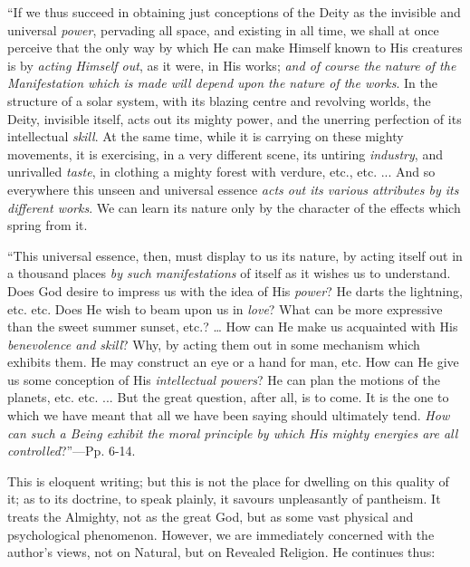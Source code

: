``If we thus
succeed in obtaining just conceptions of the Deity as the invisible
and universal \emph{power}, pervading all space, and existing in all
time, we shall at once perceive that the only way by which He can make
Himself known to His creatures is by \emph{acting Himself out}, as it
were, in His works; \emph{and of course the nature of the Manifestation
which is made will depend upon the nature of the works}. In the
structure of a solar system, with its blazing centre and revolving
worlds, the Deity, invisible itself, acts out its mighty power, and
the unerring perfection of its intellectual \emph{skill}. At the same
time, while it is carrying on these mighty movements, it is
exercising, in a very different scene, its untiring \emph{industry},
and unrivalled \emph{taste}, in clothing a mighty forest with verdure,
etc., etc. ... And so everywhere this unseen and universal essence \emph{acts
out its various attributes by its different works}. We can learn
its nature only by the character of the effects which spring from it.

``This universal
essence, then, must display to us its nature, by acting itself out in
a thousand places \emph{by such manifestations} of itself as it wishes
us to understand. Does God desire to impress us with the idea of His \emph{power}?
He darts the lightning, etc. etc. Does He wish to beam upon us in \emph{love}?
What can be more expressive than the sweet summer sunset, etc.? …
How can He make us acquainted with His \emph{benevolence and skill}?
Why, by acting them out in some mechanism which exhibits them. He may
construct an eye or a hand for man, etc. How can He give us some
conception of His \emph{intellectual powers}? He can plan the motions
of the planets, etc. etc. ... But the great question, after all, is to
come. It is the one to which we have meant that all we have been
saying should ultimately tend. \emph{How can such a Being exhibit the
moral principle by which His mighty energies are all controlled}?''—Pp.
6-14.

This is eloquent writing; but this is not the
place for dwelling on this quality of it; as to its doctrine, to
speak plainly, it savours unpleasantly of pantheism. It treats the
Almighty, not as the great God, but as some vast physical and
psychological phenomenon. However, we are immediately concerned with
the author's views, not on Natural, but on Revealed Religion. He
continues thus:

